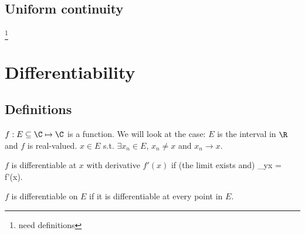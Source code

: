 \subsection{Uniform continuity}

\footnote{need definitions}


\section{Differentiability}

\subsection{Definitions}

$f: E\subseteq \C\mapsto\C$ is a function. We will look at the case: $E$ is the interval in $\R$ and $f$ is real-valued. $x\in E$ s.t. $\exists x_n\in E$, $x_n\neq x$ and $x_n\to x$.

\begin{definition}\label{def:differentiable}
$f$ is differentiable at $x$ with derivative $f'(x)$ if (the limit exists and)
\be
\lim_{y\to x} = f'(x).
\ee

$f$ is differentiable on $E$ if it is differentiable at every point in $E$.
\end{definition}

